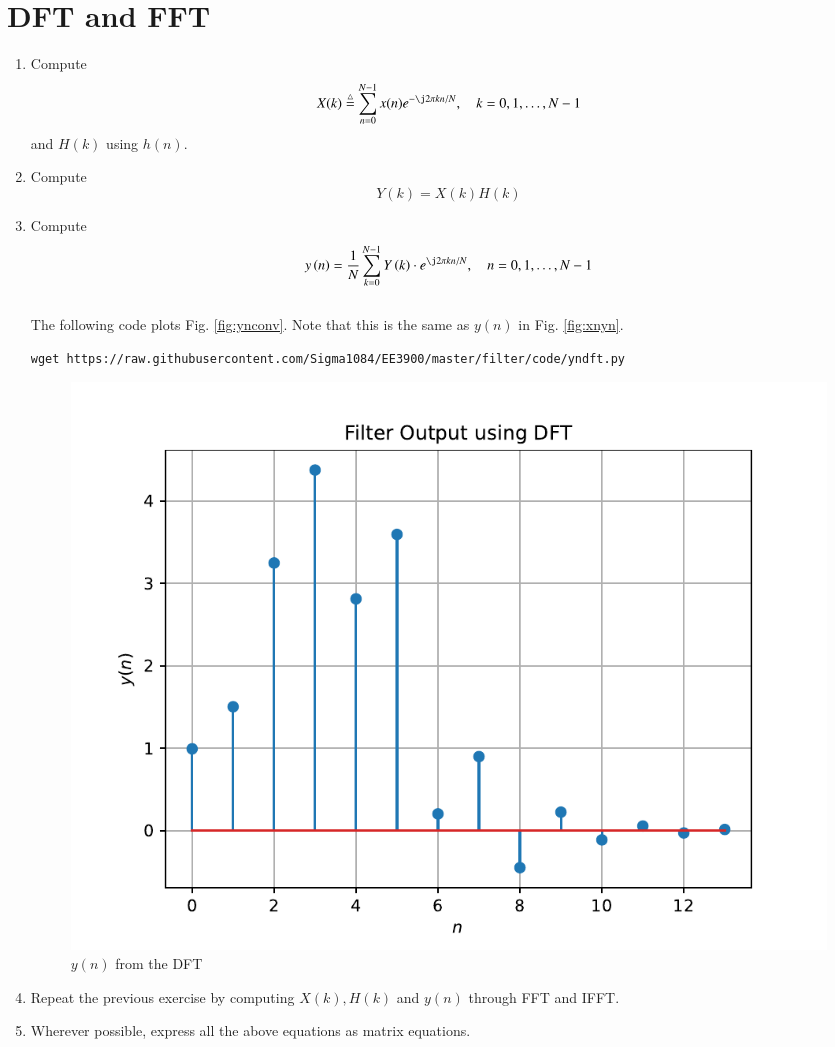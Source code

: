 \documentclass[journal,12pt,twocolumn]{IEEEtran}
\renewcommand\thesection{\arabic{section}}
\begin{document}
\section{DFT and FFT}
\begin{enumerate}[label=\thesection.\arabic*]
\item
Compute
\begin{equation}
X(k) \define \sum _{n=0}^{N-1}x(n) e^{-\j2\pi kn/N}, \quad k = 0,1,\dots, N-1
\end{equation}
and $H(k)$ using $h(n)$.
\item Compute 
\begin{equation}
Y(k) = X(k)H(k)
\end{equation}
\item Compute
\begin{equation}
 y\brak{n}={\frac {1}{N}}\sum _{k=0}^{N-1}Y\brak{k}\cdot e^{\j 2\pi kn/N},\quad n = 0,1,\dots, N-1
\end{equation}
\\
\solution The following code plots Fig. \ref{fig:ynconv}. Note that this is the same as 
$y(n)$ in  Fig. 
\ref{fig:xnyn}. 
%
\begin{lstlisting}
wget https://raw.githubusercontent.com/Sigma1084/EE3900/master/filter/code/yndft.py
\end{lstlisting}
\begin{figure}[!ht]
\centering
\includegraphics[width=\columnwidth]{./figs/yndft}
\caption{$y(n)$ from the DFT}
\label{fig:yndft}
\end{figure}

\item Repeat the previous exercise by computing $X(k), H(k)$ and $y(n)$ through FFT and 
IFFT.
\item Wherever possible, express all the above equations as matrix equations.
\end{enumerate}
%
\end{document}
